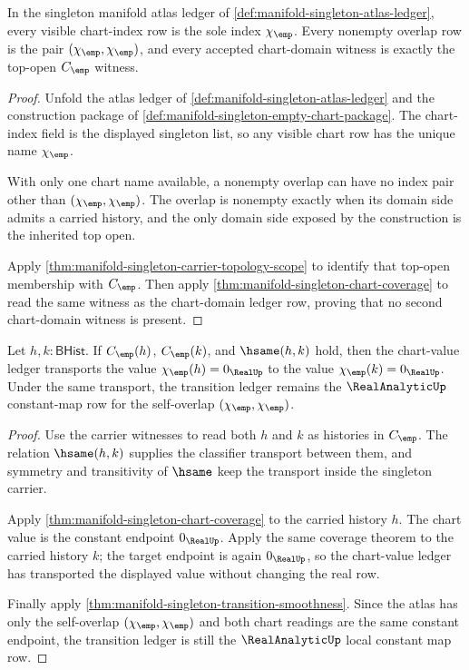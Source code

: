 \begin{theorem}
\label{thm:manifold-singleton-atlas-index-exhaustion}
In the singleton manifold atlas ledger of
\autoref{def:manifold-singleton-atlas-ledger}, every visible chart-index row is
the sole index $\chi_{\emp}$. Every nonempty overlap row is the pair
$(\chi_{\emp},\chi_{\emp})$, and every accepted chart-domain witness is exactly
the top-open $C_{\emp}$ witness.
\end{theorem}
\begin{proof}
Unfold the atlas ledger of
\autoref{def:manifold-singleton-atlas-ledger} and the construction package of
\autoref{def:manifold-singleton-empty-chart-package}. The chart-index field is
the displayed singleton list, so any visible chart row has the unique name
$\chi_{\emp}$.

With only one chart name available, a nonempty overlap can have no index pair
other than $(\chi_{\emp},\chi_{\emp})$. The overlap is nonempty exactly when its
domain side admits a carried history, and the only domain side exposed by the
construction is the inherited top open.

Apply
\autoref{thm:manifold-singleton-carrier-topology-scope} to identify that
top-open membership with $C_{\emp}$. Then apply
\autoref{thm:manifold-singleton-chart-coverage} to read the same witness as
the chart-domain ledger row, proving that no second chart-domain witness is
present.
\end{proof}

\begin{theorem}
\label{thm:manifold-singleton-chart-value-transport}
Let $h,k:\mathsf{BHist}$. If $C_{\emp}(h)$, $C_{\emp}(k)$, and $\hsame(h,k)$
hold, then the chart-value ledger transports the value
$\chi_{\emp}(h)=0_{\RealUp}$ to the value $\chi_{\emp}(k)=0_{\RealUp}$. Under
the same transport, the transition ledger remains the
$\RealAnalyticUp$ constant-map row for the self-overlap
$(\chi_{\emp},\chi_{\emp})$.
\end{theorem}
\begin{proof}
Use the carrier witnesses to read both $h$ and $k$ as histories in
$C_{\emp}$. The relation $\hsame(h,k)$ supplies the classifier transport
between them, and symmetry and transitivity of $\hsame$ keep the transport
inside the singleton carrier.

Apply \autoref{thm:manifold-singleton-chart-coverage} to the carried history
$h$. The chart value is the constant endpoint $0_{\RealUp}$. Apply the same
coverage theorem to the carried history $k$; the target endpoint is again
$0_{\RealUp}$, so the chart-value ledger has transported the displayed value
without changing the real row.

Finally apply
\autoref{thm:manifold-singleton-transition-smoothness}. Since the atlas has
only the self-overlap $(\chi_{\emp},\chi_{\emp})$ and both chart readings are
the same constant endpoint, the transition ledger is still the
$\RealAnalyticUp$ local constant map row.
\end{proof}
